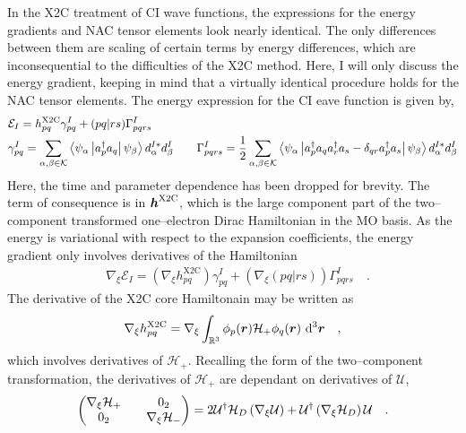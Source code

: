 In the X2C treatment of CI wave functions, the expressions for the energy
gradients and NAC tensor elements look nearly identical. The only differences
between them are scaling of certain terms by energy differences, which are
inconsequential to the difficulties of the X2C method. Here, I will only discuss
the energy gradient, keeping in mind that a virtually identical procedure holds
for the NAC tensor elements. The energy expression for the CI eave function is
given by,
\begin{align}
&\mathcal{E}_I = h^\mathrm{X2C}_{pq}\gamma^I_{pq} + 
 (pq|rs) \Gamma^I_{pqrs} \\
&\gamma^I_{pq} = 
  \sum_{\alpha,\beta \in \mathcal{K}} 
  \left\langle \psi_\alpha \left\vert a_p^\dagger a_q \right\vert \psi_\beta \right\rangle d_\alpha^{I*} d_\beta^I
  \qquad
  \Gamma^I_{pqrs} = \frac{1}{2} \sum_{\alpha,\beta\in\mathcal{K}}
  \left\langle \psi_\alpha \left\vert a_p^\dagger a_q a_r^\dagger a_s - \delta_{qr}a_p^\dagger
  a_s \right\vert \psi_\beta \right\rangle d_\alpha^{I*} d_\beta^I
\end{align}
Here, the time and parameter dependence has been dropped for brevity. The term
of consequence is in $\boldsymbol{h}^\mathrm{X2C}$, which is the large component part of
the two--component transformed one--electron Dirac Hamiltonian in the MO basis.
As the energy is variational with respect to the expansion coefficients, the
energy gradient only involves derivatives of the Hamiltonian
\begin{align}
&\nabla_\xi \mathcal{E}_I = \left(\nabla_\xi h^\mathrm{X2C}_{pq}\right)
  \gamma^I_{pq} + 
 \left( \nabla_\xi (pq|rs) \right)\Gamma^I_{pqrs} \quad.
\end{align}
The derivative of the X2C core Hamiltonain may be written as
\begin{equation}
\nabla_\xi h^\mathrm{X2C}_{pq} = \nabla_\xi\int_{\mathbb{R}^3} \phi_p(\boldsymbol{r})
  \mathcal{H}_+ \phi_q(\boldsymbol{r}) \text{
 }\mathrm{d}^3\boldsymbol{r} \quad,
\end{equation}
which involves derivatives of $\mathcal{H}_+$. Recalling the form of the
two--component transformation, the derivatives of $\mathcal{H}_+$ are dependant
on derivatives of $\mathcal{U}$,
\begin{equation}
\begin{pmatrix} \nabla_\xi \mathcal{H}_+ && 0_2 \\ 0_2 && \nabla_\xi
\mathcal{H}_- \end{pmatrix} =
2\mathcal{U}^\dagger\mathcal{H}_D\left(\nabla_\xi\mathcal{U}\right) +
\mathcal{U}^\dagger \left( \nabla_\xi\mathcal{H}_D \right) \mathcal{U}\quad.
\end{equation}
